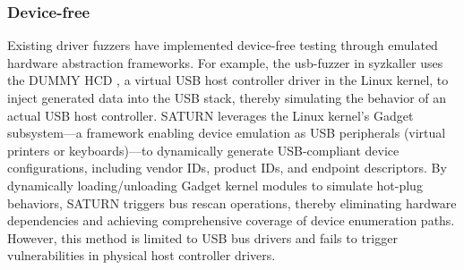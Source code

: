 \subsubsection{Device-free}
 Existing driver fuzzers have implemented device-free testing through emulated hardware abstraction frameworks. For example, the usb-fuzzer in syzkaller uses the DUMMY HCD \cite{DummyHCD}, a virtual USB host controller driver in the Linux kernel, to inject generated data into the USB stack, thereby simulating the behavior of an actual USB host controller. SATURN \cite{Xu2024Saturn} leverages the Linux kernel's Gadget subsystem—a framework enabling device emulation as USB peripherals (\eg virtual printers or keyboards)—to dynamically generate USB-compliant device configurations, including vendor IDs, product IDs, and endpoint descriptors. By dynamically loading/unloading Gadget kernel modules to simulate hot-plug behaviors, SATURN triggers bus rescan operations, thereby eliminating hardware dependencies and achieving comprehensive coverage of device enumeration paths. However, this method is limited to USB bus drivers and fails to trigger vulnerabilities in physical host controller drivers.


